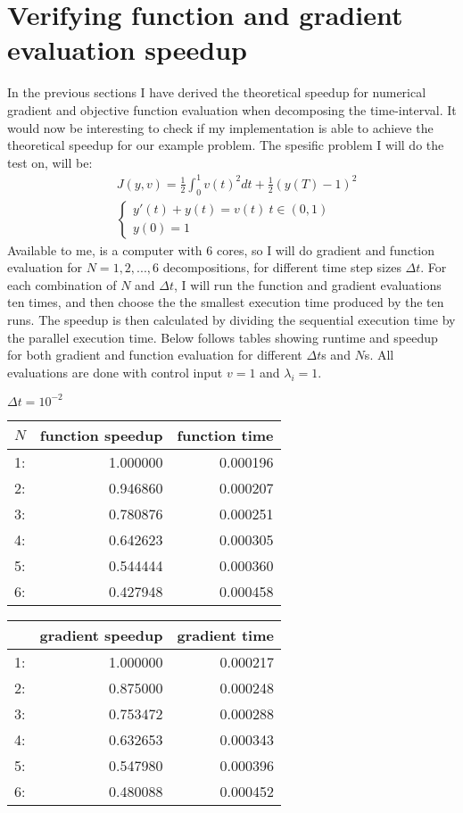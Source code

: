 \section{Verifying function and gradient evaluation speedup}
In the previous sections I have derived the theoretical speedup for numerical gradient and objective function evaluation when decomposing the time-interval. It would now be interesting to check if my implementation is able to achieve the theoretical speedup for our example problem. The spesific problem I will do the test on, will be:
\begin{align*}
&J(y,v) = \frac{1}{2}\int_0^1v(t)^2dt + \frac{1}{2}(y(T)-1)^2 \\
&\left\{
     \begin{array}{lr}
       	y'(t)+y(t) = v(t) \ t\in(0,1)\\
       	y(0)=1
     \end{array}
   \right. 
\end{align*}
Available to me, is a computer with 6 cores, so I will do gradient and function evaluation for $N=1,2,...,6$ decompositions, for different time step sizes $\Delta t$. For each combination of $N$ and $\Delta t$, I will run the function and gradient evaluations ten times, and then choose the the smallest execution time produced by the ten runs. The speedup is then calculated by dividing the sequential execution time by the parallel execution time. Below follows tables showing runtime and speedup for both gradient and function evaluation for different $\Delta t$s and $N$s. All evaluations are done with control input $v=1$ and $\lambda_i=1$.  
\\
\begin{center}
$\Delta t=10^{-2}$\\
\begin{tabular}{lrr}
\toprule
{} $N$&   function speedup &      function time \\
\midrule
1:  &  1.000000 &  0.000196 \\
2: &  0.946860 &  0.000207 \\
3: &  0.780876 &  0.000251 \\
4: &  0.642623 &  0.000305 \\
5: &  0.544444 &  0.000360 \\
6: &  0.427948 &  0.000458 \\
\bottomrule
\end{tabular}
\begin{tabular}{lrr}
\toprule
{} &  gradient speedup &     gradient time \\
\midrule
1:  &  1.000000 &  0.000217 \\
2: &  0.875000 &  0.000248 \\
3: &  0.753472 &  0.000288 \\
4: &  0.632653 &  0.000343 \\
5: &  0.547980 &  0.000396 \\
6: &  0.480088 &  0.000452 \\
\bottomrule
\end{tabular}
\end{center}
